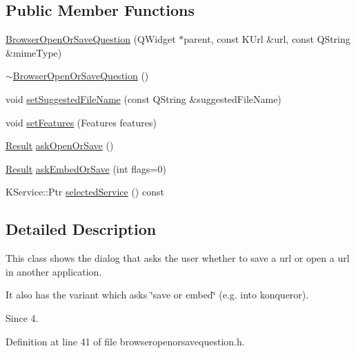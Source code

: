 \subsection*{Public Member Functions}
\begin{DoxyCompactItemize}
\item 
\hyperlink{classKParts_1_1BrowserOpenOrSaveQuestion_a93097e04518164345d399f7c376b993e}{Browser\+Open\+Or\+Save\+Question} (Q\+Widget $\ast$parent, const K\+Url \&url, const Q\+String \&mime\+Type)
\item 
\hyperlink{classKParts_1_1BrowserOpenOrSaveQuestion_a6af2b8e427bf2bb922bb9fcc09df6a65}{$\sim$\+Browser\+Open\+Or\+Save\+Question} ()
\item 
void \hyperlink{classKParts_1_1BrowserOpenOrSaveQuestion_a82733c7818b3c6ee5987ee8c7450c29f}{set\+Suggested\+File\+Name} (const Q\+String \&suggested\+File\+Name)
\item 
void \hyperlink{classKParts_1_1BrowserOpenOrSaveQuestion_a998acfa7caa8a47794cc0eb2682a503d}{set\+Features} (Features features)
\item 
\hyperlink{classKParts_1_1BrowserOpenOrSaveQuestion_a12842198b7684e9e246e9a207eabc93f}{Result} \hyperlink{classKParts_1_1BrowserOpenOrSaveQuestion_a5d9df0d831477073f43071dfe580456d}{ask\+Open\+Or\+Save} ()
\item 
\hyperlink{classKParts_1_1BrowserOpenOrSaveQuestion_a12842198b7684e9e246e9a207eabc93f}{Result} \hyperlink{classKParts_1_1BrowserOpenOrSaveQuestion_ad261c14f0e8e32b99b61029fdd5f2fad}{ask\+Embed\+Or\+Save} (int flags=0)
\item 
K\+Service\+::\+Ptr \hyperlink{classKParts_1_1BrowserOpenOrSaveQuestion_aaaa2f3a0f18e7acc82152bf296c227da}{selected\+Service} () const 
\end{DoxyCompactItemize}


\subsection{Detailed Description}
This class shows the dialog that asks the user whether to save a url or open a url in another application.

It also has the variant which asks \char`\"{}save or embed\char`\"{} (e.\+g. into konqueror).

\begin{DoxySince}{Since}
4. 
\end{DoxySince}


Definition at line 41 of file browseropenorsavequestion.\+h.



